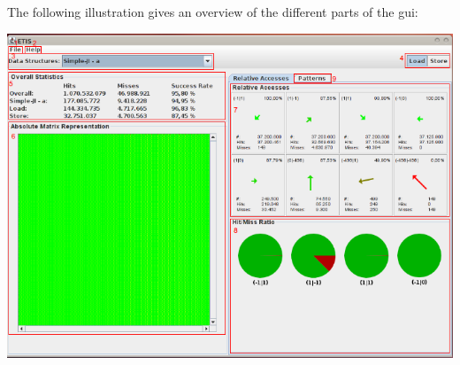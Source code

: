 The following illustration gives an overview of the different parts
of the gui:

\includegraphics[scale=0.6]{gui/GUIOverview2.png}

